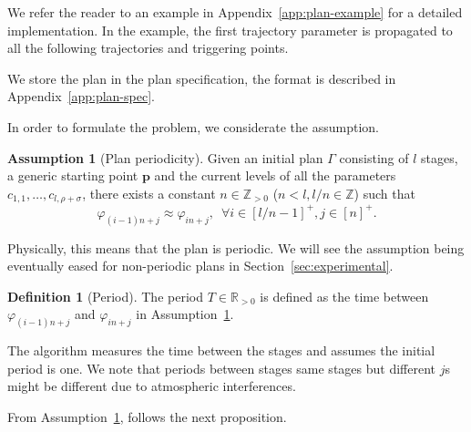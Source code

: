 \documentclass[letterpaper,10pt,conference]{ieeeconf}
\theoremstyle{definition}
\newtheorem{assm}[thm]{Assumption}
\newtheorem{defn}{Definition}[section]
\begin{document}
We refer the reader to an example in Appendix~\ref{app:plan-example} for a detailed implementation. In the example, the first trajectory parameter is propagated to all the following trajectories and triggering points. 

We store the plan in the plan specification, the format is described in Appendix~\ref{app:plan-spec}. 

In order to formulate the problem, we considerate the assumption.

\begin{assm}[Plan periodicity]\label{assm:periodic}
  Given an initial plan $\Gamma$ consisting of $l$ stages, a generic starting point $\mathbf{p}$ and the current levels of all the parameters $c_{1,1},\dots,c_{l,\rho+\sigma}$, there exists a constant $n\in\mathbb{Z}_{>0}$ ($n<l,l/n\in\mathbb{Z}$) such that
  \begin{equation*}
    \varphi_{(i-1)n+j}\approx \varphi_{in+j},\,\,\,\forall i\in[l/n-1]^+,j\in[n]^+.
  \end{equation*}
\end{assm}

Physically, this means that the plan is periodic. We will see the assumption being eventually eased for non-periodic plans in Section~\ref{sec:experimental}.

\begin{defn}[Period]\label{def:period}
  The period $T\in\mathbb{R}_{> 0}$ is defined as the time between $\varphi_{(i-1)n+j}$ and $\varphi_{in+j}$ in Assumption~\ref{assm:periodic}.
\end{defn}

The algorithm measures the time between the stages and assumes the initial period is one. We note that periods between stages same stages but different $j$s might be different due to atmospheric interferences. 

From Assumption~\ref{assm:periodic}, follows the next proposition.
\end{document}
